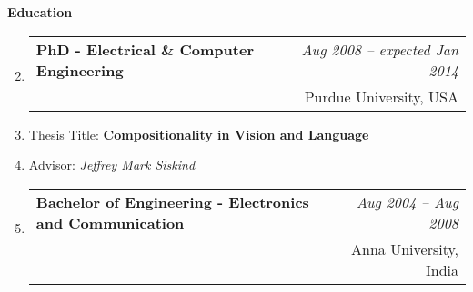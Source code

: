 \documentclass[10pt]{article}
\makeatletter
\newenvironment{benumerate}[2]{
    \let\oldItem\item
    \def\item{\addtocounter{enumi}{-2}\oldItem}
    \begin{enumerate}[#2]
    \setcounter{enumi}{#1}
    \addtocounter{enumi}{1}}
  {\end{enumerate}}
\newenvironment{position}[4]
{%
\item
  \begin{tabular*}{6.5in}{l@{\extracolsep{\fill}}r}
    \textbf{#1} & \textit{#2} \\ #3 & \small{#4} \\
  \end{tabular*}
  }
  { %
}
\newenvironment{region}[3]{%
  \vspace*{0.5ex}
  {\large \textbf{#1}}
  \begin{benumerate}{#3}{\color{RoyalBlue}#2}}
  {\end{benumerate}}
\newenvironment{nonumregion}[1]{%
\begin{region}{#1}{}{1}}
{\end{region}}
\makeatother
\begin{document}
\begin{nonumregion}{Education}
  \begin{position}{PhD - Electrical \& Computer Engineering}
    {Aug 2008 -- expected Jan 2014}
    {}
    {Purdue University, USA}
    \vspace{-3ex}
  \item Thesis Title: \textbf{Compositionality in Vision and Language}
    \vspace{-1.5ex}
  \item Advisor: \textit{Jeffrey Mark Siskind}
  \end{position}
  \begin{position} {Bachelor of Engineering - Electronics and Communication}
    {Aug 2004 -- Aug 2008}
    {}
    {Anna University, India}
  \end{position}
\end{nonumregion}
\end{document}
